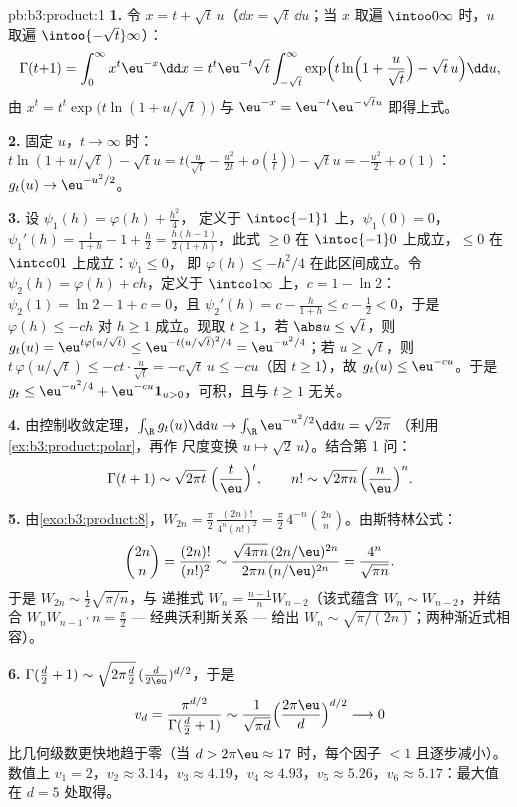 \begin{solution}{pb:b3:product:1}
\textbf{1.} 令 $x = t + \sqrt t\,u$（$\dd x = \sqrt
t\,\dd u$；当 $x$ 取遍 $\intoo0\infty$ 时，$u$ 取遍
$\intoo{-\sqrt t}\infty$）：
\[
\Gamma(t{+}1) = \int_0^\infty x^t\eu^{-x}\dd x
= t^t\eu^{-t}\sqrt t\int_{-\sqrt t}^{\infty}
\exp\Bigl(t\ln\Bigl(1 + \frac u{\sqrt t}\Bigr) - \sqrt
t\,u\Bigr)\dd u,
\]
由 $x^t = t^t\exp\bigl(t\ln(1 + u/\sqrt t)\bigr)$ 与
$\eu^{-x} = \eu^{-t}\eu^{-\sqrt tu}$ 即得上式。

\textbf{2.} 固定 $u$，$t \to \infty$ 时：$t\ln(1 +
u/\sqrt t) - \sqrt tu = t\bigl(\frac u{\sqrt t} -
\frac{u^2}{2t} + o(\frac1t)\bigr) - \sqrt tu = -\frac{u^2}2 +
o(1)$：$g_t(u) \to \eu^{-u^2/2}$。

\textbf{3.} 设 $\psi_1(h) = \varphi(h) + \frac{h^2}4$，
定义于 $\intoc{-1}1$ 上，$\psi_1(0) = 0$，$\psi_1'(h) = \frac1{1+h} -
1 + \frac h2 = \frac{h(h-1)}{2(1+h)}$，此式 $\geq 0$ 在
$\intoc{-1}0$ 上成立，$\leq 0$ 在 $\intcc01$ 上成立：$\psi_1 \leq 0$，
即 $\varphi(h) \leq -h^2/4$ 在此区间成立。令 $\psi_2(h) =
\varphi(h) + ch$，定义于 $\intco1\infty$ 上，$c = 1 - \ln2$：$\psi_2(1)
= \ln2 - 1 + c = 0$，且 $\psi_2'(h) = c - \frac h{1+h} \leq c -
\frac12 < 0$，于是 $\varphi(h) \leq -ch$ 对 $h \geq 1$ 成立。现取 $t
\geq 1$，若 $\abs u \leq \sqrt t$，则 $g_t(u) =
\eu^{t\varphi(u/\sqrt t)} \leq \eu^{-t(u/\sqrt t)^2/4} =
\eu^{-u^2/4}$；若 $u \geq \sqrt t$，则 $t\,\varphi(u/\sqrt t) \leq
-ct\cdot\frac u{\sqrt t} = -c\sqrt t\,u \leq -cu$（因 $t \geq
1$），故 $g_t(u) \leq \eu^{-cu}$。于是 $g_t \leq \eu^{-u^2/4} +
\eu^{-cu}\mathbf 1_{u>0}$，可积，且与 $t \geq
1$ 无关。

\textbf{4.} 由控制收敛定理，$\int_\R g_t(u)\dd u \to
\int_\R\eu^{-u^2/2}\dd u = \sqrt{2\pi}$
（利用\cref{ex:b3:product:polar}，再作
尺度变换 $u\mapsto\sqrt2\,u$）。结合第 1 问：
\[
\Gamma(t + 1) \sim \sqrt{2\pi t}\;\Bigl(\frac
t\eu\Bigr)^t,\qquad
n! \sim \sqrt{2\pi n}\,\Bigl(\frac n\eu\Bigr)^n .
\]

\textbf{5.} 由\cref{exo:b3:product:8}，$W_{2n} =
\frac\pi2\,\frac{(2n)!}{4^n(n!)^2} =
\frac\pi2\,4^{-n}\binom{2n}n$。由斯特林公式：
\[
\binom{2n}{n} = \frac{(2n)!}{(n!)^2}
\sim \frac{\sqrt{4\pi n}\,(2n/\eu)^{2n}}
{2\pi n\,(n/\eu)^{2n}} = \frac{4^n}{\sqrt{\pi n}} .
\]
于是 $W_{2n} \sim \frac12\sqrt{\pi/n}$，与
递推式 $W_n = \frac{n-1}nW_{n-2}$（该式蕴含 $W_n \sim
W_{n-2}$，并结合 $W_nW_{n-1}\cdot n = \frac\pi2$ ---
经典沃利斯关系 --- 给出 $W_n \sim
\sqrt{\pi/(2n)}$；两种渐近式相容）。

\textbf{6.} $\Gamma(\frac d2 + 1) \sim \sqrt{2\pi\frac
d2}\,(\frac d{2\eu})^{d/2}$，于是
\[
v_d = \frac{\pi^{d/2}}{\Gamma(\frac d2 + 1)}
\sim \frac{1}{\sqrt{\pi d}}\Bigl(\frac{2\pi\eu}
d\Bigr)^{d/2} \longrightarrow 0
\]
比几何级数更快地趋于零（当 $d > 2\pi\eu \approx 17$ 时，每个因子
$< 1$ 且逐步减小）。数值上 $v_1 = 2$，$v_2 \approx
3.14$，$v_3 \approx 4.19$，$v_4 \approx 4.93$，$v_5 \approx
5.26$，$v_6 \approx 5.17$：最大值在 $d = 5$ 处取得。


\end{solution}
